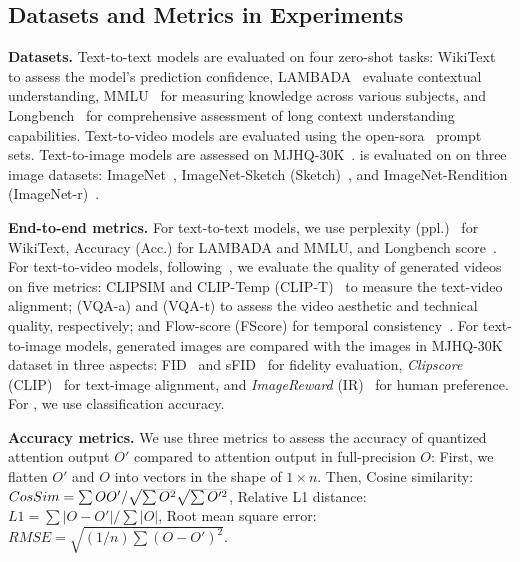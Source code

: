 \subsection{Datasets and Metrics in Experiments}  \label{sec:exp_dataset_metrics}

\noindent \noindent\textbf{Datasets.}   
Text-to-text models are evaluated on four zero-shot tasks: WikiText~\cite{merity2022pointer} to assess the model's prediction confidence, LAMBADA~\cite{paperno2016lambada} evaluate contextual understanding, MMLU~\cite{2020mmlu} for measuring knowledge across various subjects, and Longbench~\cite{bai2023longbench} for comprehensive assessment of long context understanding capabilities.
Text-to-video models are evaluated using the open-sora~\cite{opensora} prompt sets.
Text-to-image models are assessed on MJHQ-30K~\cite{li2024playground}.
\timm is evaluated on on three image datasets: ImageNet~\cite{deng2009imagenet}, ImageNet-Sketch (Sketch)~\cite{wang2019sketch}, and ImageNet-Rendition (ImageNet-r)~\cite{hendrycks2021rendition}. 

\noindent \noindent\textbf{End-to-end metrics.}   
For text-to-text models, we use perplexity (ppl.)~\cite{jelinek1977perplexity} for WikiText, Accuracy (Acc.) for LAMBADA and MMLU, and Longbench score~\cite{bai2023longbench}.
For text-to-video models, following~\citet{zhao2024viditq}, we evaluate the quality of generated videos on five metrics: CLIPSIM and CLIP-Temp (CLIP-T)~\cite{liu2024evalcrafter} to measure the text-video alignment; (VQA-a) and (VQA-t) to assess the video aesthetic and technical quality, respectively; and Flow-score (FScore) for temporal consistency~\cite{wu2023exploring}. 
For text-to-image models, generated images are compared with the images in MJHQ-30K dataset in three aspects: FID~\cite{heusel2017gans} and sFID~\cite{salimans2016improved} for fidelity evaluation, \textit{Clipscore} (CLIP)~\cite{hessel2021clipscore} for text-image alignment, and \textit{ImageReward} (IR)~\cite{xu2024imagereward} for human preference.
For \timm, we use classification accuracy.

\noindent\textbf{Accuracy metrics.} We use three metrics to assess the accuracy of quantized attention output $O'$ compared to attention output in full-precision $O$: First, we flatten $O'$ and $O$ into vectors in the shape of $1\times n$. Then, Cosine similarity: $CosSim=\sum OO' / \smash{\sqrt{\sum O^2}} \smash{\sqrt{\sum O'^2}}$, Relative L1 distance: $L1=\sum |O - O'| / \sum |O|$, Root mean square error: $RMSE=\sqrt{(1/n) \sum (O - O')^2}$.

